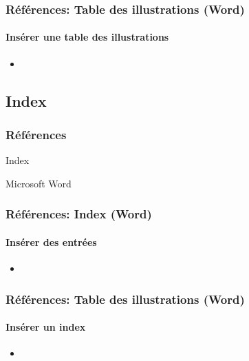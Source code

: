 \documentclass[xcolor=table]{beamer}
\begin{document}
\begin{frame}[t]
\frametitle{Références: Table des illustrations (Word)}
\framesubtitle{Insérer une table des illustrations}

\begin{minipage}{0.61\textwidth}
	\begin{itemize}
		\item 
	\end{itemize}
\end{minipage}
\begin{minipage}{0.38\textwidth}
	
	
\end{minipage}

\end{frame}

\subsection{Index}

\begin{frame}
\frametitle{Références}

\begin{center}
	Index 
	
	Microsoft Word
\end{center}

\end{frame}

\begin{frame}[t]
\frametitle{Références: Index (Word)}
\framesubtitle{Insérer des entrées}

\begin{minipage}{0.61\textwidth}
\begin{itemize}
	\item 
\end{itemize}
\end{minipage}
\begin{minipage}{0.38\textwidth}


\end{minipage}

\end{frame}

\begin{frame}[t]
\frametitle{Références: Table des illustrations (Word)}
\framesubtitle{Insérer un index}

\begin{minipage}{0.61\textwidth}
\begin{itemize}
\item 
\end{itemize}
\end{minipage}
\begin{minipage}{0.38\textwidth}


\end{minipage}

\end{frame}
\end{document}
